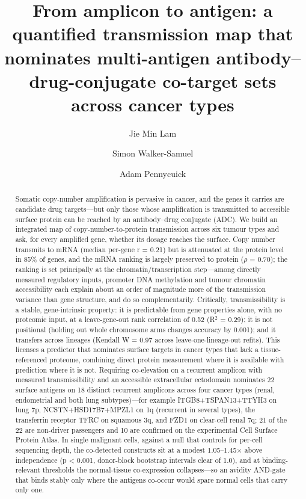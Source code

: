 \documentclass[times, twoside]{zHenriquesLab-StyleBioRxiv}
\begin{document}
\title{From amplicon to antigen: a quantified transmission map that nominates multi-antigen antibody--drug-conjugate co-target sets across cancer types}

\author[1]{Jie Min Lam}
\author[1]{Simon Walker-Samuel}
\author[2,\Letter]{Adam Pennycuick}


\maketitle

\begin{abstract}
Somatic copy-number amplification is pervasive in cancer, and the genes it carries are candidate drug targets---but only those whose amplification is transmitted to accessible surface protein can be reached by an antibody--drug conjugate (ADC). We build an integrated map of copy-number-to-protein transmission across six tumour types and ask, for every amplified gene, whether its dosage reaches the surface. Copy number transmits to mRNA (median per-gene r = 0.21) but is attenuated at the protein level in 85\% of genes, and the mRNA ranking is largely preserved to protein ($\rho$ = 0.70); the ranking is set principally at the chromatin/transcription step---among directly measured regulatory inputs, promoter DNA methylation and tumour chromatin accessibility each explain about an order of magnitude more of the transmission variance than gene structure, and do so complementarily. Critically, transmissibility is a stable, gene-intrinsic property: it is predictable from gene properties alone, with no proteomic input, at a leave-gene-out rank correlation of 0.52 (R$^2$ = 0.29); it is not positional (holding out whole chromosome arms changes accuracy by 0.001); and it transfers across lineages (Kendall W = 0.97 across leave-one-lineage-out refits). This licenses a predictor that nominates surface targets in cancer types that lack a tissue-referenced proteome, combining direct protein measurement where it is available with prediction where it is not. Requiring co-elevation on a recurrent amplicon with measured transmissibility and an accessible extracellular ectodomain nominates 22 surface antigens on 18 distinct recurrent amplicons across four cancer types (renal, endometrial and both lung subtypes)---for example ITGB8+TSPAN13+TTYH3 on lung 7p, NCSTN+HSD17B7+MPZL1 on 1q (recurrent in several types), the transferrin receptor TFRC on squamous 3q, and FZD1 on clear-cell renal 7q; 21 of the 22 are non-driver passengers and 10 are confirmed on the experimental Cell Surface Protein Atlas. In single malignant cells, against a null that controls for per-cell sequencing depth, the co-detected constructs sit at a modest 1.05--1.45$\times$ above independence (p < 0.001, donor-block bootstrap intervals clear of 1.0), and at binding-relevant thresholds the normal-tissue co-expression collapses---so an avidity AND-gate that binds stably only where the antigens co-occur would spare normal cells that carry only one. 
\end{abstract}
\end{document}
